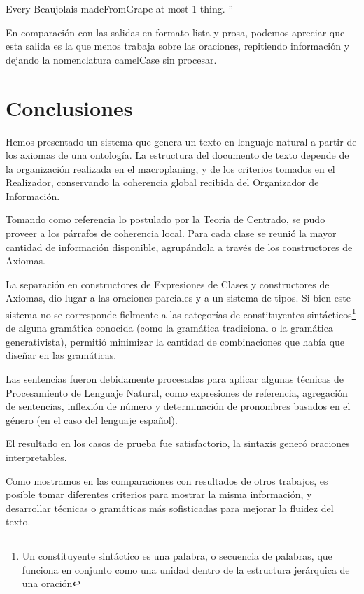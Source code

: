 Every Beaujolais madeFromGrape at most 1 thing.
''

En comparación con las salidas en formato lista y prosa, podemos apreciar que esta salida es la que menos trabaja sobre las oraciones, repitiendo información y dejando la nomenclatura camelCase sin procesar.

\section{Conclusiones}
Hemos presentado un sistema que genera un texto en lenguaje natural a partir de los axiomas de una ontología. La estructura del documento de texto depende de la organización realizada en el macroplaning, y de los criterios tomados en el Realizador, conservando la coherencia global recibida del Organizador de Información. 

Tomando como referencia lo postulado por la Teoría de Centrado, se pudo proveer a los párrafos de coherencia local. Para cada clase se reunió la mayor cantidad de información disponible, agrupándola a través de los constructores de Axiomas.

La separación en constructores de Expresiones de Clases y constructores de Axiomas, dio lugar a las oraciones parciales y a un sistema de tipos. Si bien este sistema no se corresponde fielmente a las categorías de constituyentes sintácticos\footnote{Un constituyente sintáctico es una palabra, o secuencia de palabras, que funciona en conjunto como una unidad dentro de la estructura jerárquica de una oración} de alguna gramática conocida (como la gramática tradicional o la gramática generativista), permitió minimizar la cantidad de combinaciones que había que diseñar en las gramáticas.

Las sentencias fueron debidamente procesadas para aplicar algunas técnicas de Procesamiento de Lenguaje Natural, como expresiones de referencia, agregación de sentencias, inflexión de número y determinación de pronombres basados en el género (en el caso del lenguaje español). 

El resultado en los casos de prueba fue satisfactorio, la sintaxis generó oraciones interpretables.

Como mostramos en las comparaciones con resultados de otros trabajos, es posible tomar diferentes criterios para mostrar la misma información, y desarrollar técnicas o gramáticas más sofisticadas para mejorar la fluidez del texto.